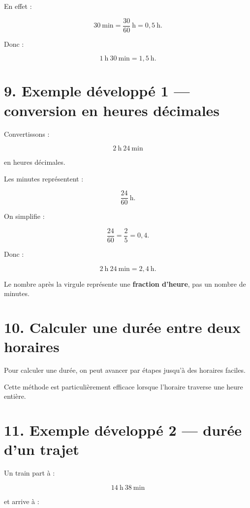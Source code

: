 En effet :

\[
30\ \text{min}
=
\dfrac{30}{60}\ \text{h}
=
0{,}5\ \text{h}.
\]

Donc :

\[
\boxed{
1\ \text{h}\ 30\ \text{min}
=
1{,}5\ \text{h}
}.
\]

\section{9. Exemple développé 1 — conversion en heures décimales}

Convertissons :

\[
2\ \text{h}\ 24\ \text{min}
\]

en heures décimales.

Les minutes représentent :

\[
\dfrac{24}{60}\ \text{h}.
\]

On simplifie :

\[
\dfrac{24}{60}
=
\dfrac{2}{5}
=
0{,}4.
\]

Donc :

\[
\boxed{
2\ \text{h}\ 24\ \text{min}
=
2{,}4\ \text{h}
}.
\]

Le nombre après la virgule représente une \textbf{fraction d’heure}, pas un nombre de minutes.

\section{10. Calculer une durée entre deux horaires}

Pour calculer une durée, on peut avancer par étapes jusqu’à des horaires faciles.


Cette méthode est particulièrement efficace lorsque l’horaire traverse une heure entière.

\section{11. Exemple développé 2 — durée d’un trajet}

Un train part à :

\[
14\ \text{h}\ 38\ \text{min}
\]

et arrive à :

